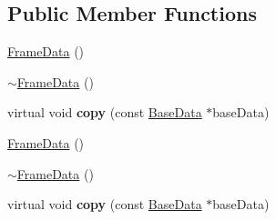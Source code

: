 \subsection*{Public Member Functions}
\begin{DoxyCompactItemize}
\item 
\hyperlink{classcocostudio_1_1FrameData_a224567ed5169fb6c65a4d40d643784a7}{Frame\+Data} ()
\item 
\hyperlink{classcocostudio_1_1FrameData_a89fdb7ff847e4e7d17624635feaaabe3}{$\sim$\+Frame\+Data} ()
\item 
\mbox{\label{classcocostudio_1_1FrameData_a69a7acbc87baa4a3a728b4d4201391c8}} 
virtual void {\bfseries copy} (const \hyperlink{classcocostudio_1_1BaseData}{Base\+Data} $\ast$base\+Data)
\item 
\hyperlink{classcocostudio_1_1FrameData_a224567ed5169fb6c65a4d40d643784a7}{Frame\+Data} ()
\item 
\hyperlink{classcocostudio_1_1FrameData_a89fdb7ff847e4e7d17624635feaaabe3}{$\sim$\+Frame\+Data} ()
\item 
\mbox{\label{classcocostudio_1_1FrameData_a3b4f01f5916fe1e6c9343e960854f83d}} 
virtual void {\bfseries copy} (const \hyperlink{classcocostudio_1_1BaseData}{Base\+Data} $\ast$base\+Data)
\end{DoxyCompactItemize}
